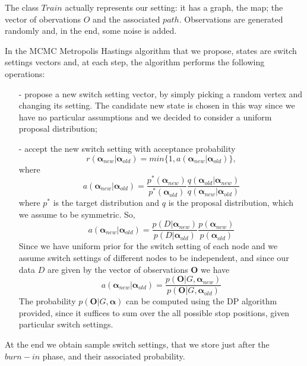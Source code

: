 \documentclass[]{article}
\begin{document}
The class $Train$ actually represents our setting: it has a graph, the map; the vector of obervations $O$ and the associated $path$. Observations are generated randomly and, in the end, some noise is added.

In the MCMC Metropolis Hastings algorithm that we propose, states are switch settings vectors and, at each step, the algorithm performs the following operations:
\begin{enumerate}
	\item[-] propose a new switch setting vector, by simply picking a random vertex and changing its setting. The candidate new state is chosen in this way since we have no particular assumptions and we decided to consider a uniform proposal distribution;
	\item[-] accept the new switch setting with acceptance probability 
	$$
	r(\mathbf{\alpha}_{new}|\mathbf{\alpha}_{old}) = min\{1, a(\mathbf{\alpha}_{new}|\mathbf{\alpha}_{old})\},
	$$
	where
	$$
	a(\mathbf{\alpha}_{new}|\mathbf{\alpha}_{old}) = \frac{p^*(\mathbf{\alpha}_{new})}{p^*(\mathbf{\alpha}_{old})}\frac{q(\mathbf{\alpha}_{old}|\mathbf{\alpha}_{new})}{q(\mathbf{\alpha}_{new}|\mathbf{\alpha}_{old})} 
	$$
	where $p^*$ is the target distribution and $q$ is the proposal distribution, which we assume to be symmetric. So,
	$$
	a(\mathbf{\alpha}_{new}|\mathbf{\alpha}_{old}) = \frac{p(D|\mathbf{\alpha}_{new})}{p(D|\mathbf{\alpha}_{old})} \frac{p(\mathbf{\alpha}_{new})}{p(\mathbf{\alpha}_{old})}
	$$
	Since we have uniform prior for the switch setting of each node and we assume switch settings of different nodes to be independent, and since our data $D$ are given by the vector of observations $\mathbf{O}$ we have
	$$
	a(\mathbf{\alpha}_{new}|\mathbf{\alpha}_{old}) = \frac{p(\mathbf{O}|G,\mathbf{\alpha}_{new})}{p(\mathbf{O}|G,\mathbf{\alpha}_{old})}
	$$
	The probability $p(\mathbf{O}|G,\mathbf{\alpha})$ can be computed using the DP algorithm provided, since it suffices to sum over the all possible stop positions, given particular switch settings. 
\end{enumerate}
At the end we obtain sample switch settings, that we store just after the $burn-in$ phase, and their associated probability.
\end{document}

